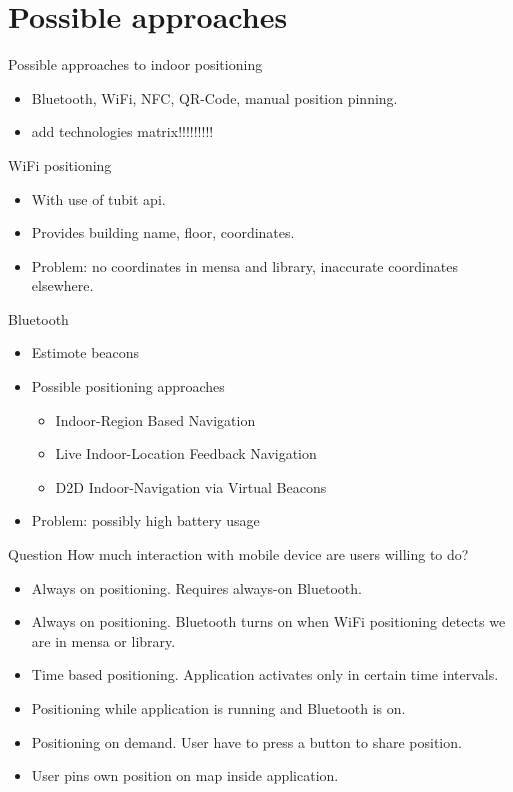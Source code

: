 \documentclass[9pt]{beamer}
\begin{document}
\section{Possible approaches}

\begin{frame}{Possible approaches to indoor positioning}
	\begin{itemize}
	\item Bluetooth, WiFi, NFC, QR-Code, manual position pinning\cite{brimicombe2009location}.
	\item add technologies matrix!!!!!!!!!
	\end{itemize}
\end{frame}

\begin{frame}{WiFi positioning}
	\begin{itemize}
	\item With use of tubit api.
	\item Provides building name, floor, coordinates.
	\item Problem: no coordinates in mensa and library, inaccurate coordinates elsewhere.
	\end{itemize}
\end{frame}

\begin{frame}{Bluetooth}
	\begin{itemize}
	\item Estimote beacons
	\item Possible positioning approaches
		\begin{itemize}
			\item Indoor-Region Based Navigation
			\item Live Indoor-Location Feedback Navigation
			\item D2D Indoor-Navigation via Virtual Beacons
		\end{itemize}
	\item Problem: possibly high battery usage
	\end{itemize}
\end{frame}

\begin{frame}{Question}
	How much interaction with mobile device are users willing to do?
	\begin{itemize}	
	\item Always on positioning. Requires always-on Bluetooth.
	\item Always on positioning. Bluetooth turns on when WiFi positioning detects we are in mensa or library.
	\item Time based positioning. Application activates only in certain time intervals.
	\item Positioning while application is running and Bluetooth is on.
	\item Positioning on demand. User have to press a button to share position.
	\item User pins own position on map inside application.
	\end{itemize}
\end{frame}
\end{document}
